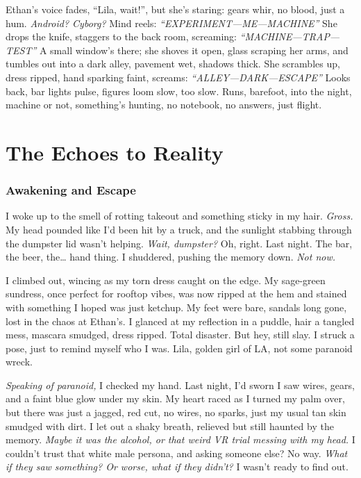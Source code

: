 \documentclass[12pt]{article}
\begin{document}
\textnormal{Ethan}’s voice fades, “Lila, wait!”, but she’s staring: gears whir, no blood, just a hum. \textit{Android? Cyborg?} Mind reels: \textit{“EXPERIMENT—ME—MACHINE”} She drops the knife, staggers to the back room, screaming: \textit{“MACHINE—TRAP—TEST”} A small window’s there; she shoves it open, glass scraping her arms, and tumbles out into a dark alley, pavement wet, shadows thick. She scrambles up, dress ripped, hand sparking faint, screams: \textit{“ALLEY—DARK—ESCAPE”} Looks back, bar lights pulse, figures loom slow, too slow. Runs, barefoot, into the night, machine or not, something’s hunting, no notebook, no answers, just flight.

\part{The Echoes to Reality}

\section{Awakening and Escape}

I woke up to the smell of rotting takeout and something sticky in my hair. \textit{Gross.} My head pounded like I’d been hit by a truck, and the sunlight stabbing through the dumpster lid wasn’t helping. \textit{Wait, dumpster?} Oh, right. Last night. The bar, the beer, the… hand thing. I shuddered, pushing the memory down. \textit{Not now.}

I climbed out, wincing as my torn dress caught on the edge. My sage-green sundress, once perfect for rooftop vibes, was now ripped at the hem and stained with something I hoped was just ketchup. My feet were bare, sandals long gone, lost in the chaos at \textnormal{Ethan}’s. I glanced at my reflection in a puddle, hair a tangled mess, mascara smudged, dress ripped. Total disaster. But hey, still slay. I struck a pose, just to remind myself who I was. \textnormal{Lila}, golden girl of LA, not some paranoid wreck.

\textit{Speaking of paranoid,} I checked my hand. Last night, I’d sworn I saw wires, gears, and a faint blue glow under my skin. My heart raced as I turned my palm over, but there was just a jagged, red cut, no wires, no sparks, just my usual tan skin smudged with dirt. I let out a shaky breath, relieved but still haunted by the memory. \textit{Maybe it was the alcohol, or that weird VR trial messing with my head.} I couldn’t trust that white male persona, and asking someone else? No way. \textit{What if they saw something? Or worse, what if they didn’t?} I wasn’t ready to find out.
\end{document}
